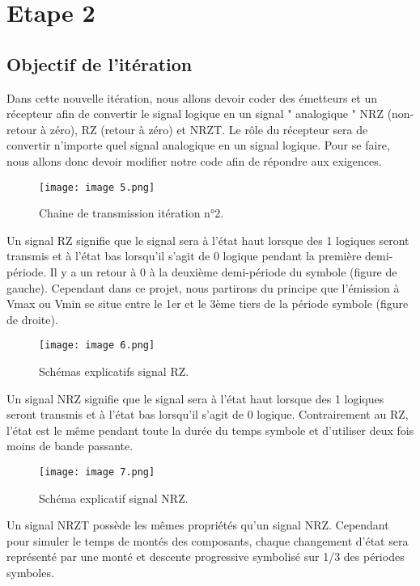 \section{Etape 2}
\subsection{Objectif de l'itération}

Dans cette nouvelle itération, nous allons devoir coder des émetteurs et un récepteur afin de convertir le signal logique en un signal " analogique " NRZ (non-retour à zéro), RZ (retour à zéro) et NRZT. Le rôle du récepteur sera de convertir n'importe quel signal analogique en un signal logique. Pour se faire, nous allons donc devoir modifier notre code afin de répondre aux exigences.

\begin{figure}[h]
    \centering
    \texttt{[image: image 5.png]}
    \caption{\label{fig:image5}Chaine de transmission itération n°2.}
\end{figure}

Un signal RZ signifie que le signal sera à l'état haut lorsque des 1 logiques seront transmis et à l'état bas lorsqu'il s'agit de 0 logique pendant la première demi-période. Il y a un retour à 0 à la deuxième demi-période du symbole (figure de gauche). Cependant dans ce projet, nous partirons du principe que l'émission à Vmax ou Vmin se situe entre le 1er et le 3ème tiers de la période symbole (figure de droite).

\begin{figure}[h]
    \centering
    \texttt{[image: image 6.png]}
    \caption{\label{fig:image6}Schémas explicatifs signal RZ.}
\end{figure}

Un signal NRZ signifie que le signal sera à l'état haut lorsque des 1 logiques seront transmis et à l'état bas lorsqu'il s'agit de 0 logique. Contrairement au RZ, l'état est le même pendant toute la durée du temps symbole et d'utiliser deux fois moins de bande passante.

\begin{figure}[h]
    \centering
    \texttt{[image: image 7.png]}
    \caption{\label{fig:image7}Schéma explicatif signal NRZ.}
\end{figure}

Un signal NRZT possède les mêmes propriétés qu'un signal NRZ. Cependant pour simuler le temps de montés des composants, chaque changement d'état sera représenté par une monté et descente progressive symbolisé sur 1/3 des périodes symboles.

